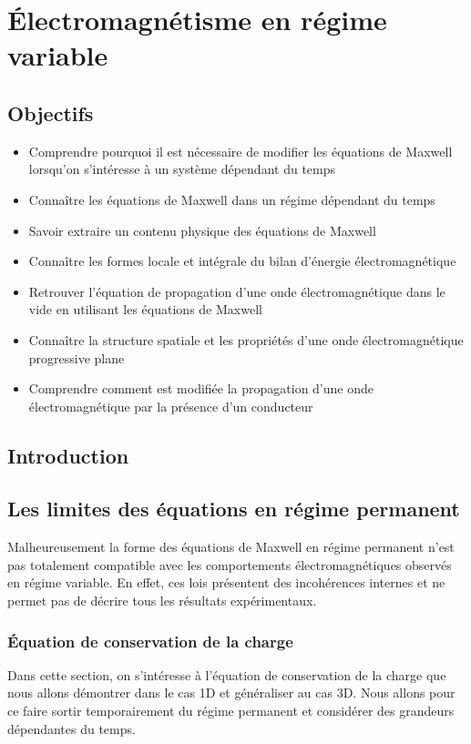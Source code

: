 \chapter{Électromagnétisme en régime variable}
\label{chap:maxwell}
\section*{Objectifs}
\label{sec:maxwell_objectifs}

\begin{itemize}
	\item Comprendre pourquoi il est nécessaire de modifier les équations 
	  de Maxwell lorsqu'on s'intéresse à un système dépendant du temps
	\item Connaître les équations de Maxwell dans un régime dépendant du temps 
	\item Savoir extraire un contenu physique des équations de Maxwell
	\item Connaître les formes locale et intégrale du bilan d'énergie
	  électromagnétique
	\item Retrouver l'équation de propagation d'une onde électromagnétique
	  dans le vide en utilisant les équations de Maxwell
	\item Connaître la structure spatiale et les propriétés d'une
	  onde électromagnétique progressive plane
	\item Comprendre comment est modifiée la propagation d'une onde 
	  électromagnétique par la présence d'un conducteur
\end{itemize}

\section*{Introduction}

\section{Les limites des équations en régime permanent}
Malheureusement la forme des équations de Maxwell en régime permanent n'est pas
totalement compatible avec les comportements électromagnétiques observés en régime 
variable. En effet, ces lois présentent des incohérences internes et ne permet
pas de décrire tous les résultats expérimentaux.

\subsection{Équation de conservation de la charge}
Dans cette section, on s'intéresse à l'équation de conservation de la charge
que nous allons démontrer dans le cas 1D et généraliser au cas 3D. Nous allons
pour ce faire sortir temporairement du régime permanent et considérer des
grandeurs dépendantes du temps.

